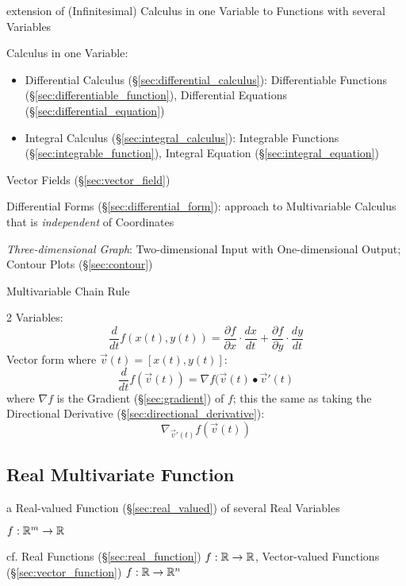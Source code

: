 extension of (Infinitesimal) Calculus in one Variable to Functions with several
Variables

Calculus in one Variable:
\begin{itemize}
\item Differential Calculus (\S\ref{sec:differential_calculus}): Differentiable
  Functions (\S\ref{sec:differentiable_function}), Differential Equations
  (\S\ref{sec:differential_equation})
\item Integral Calculus (\S\ref{sec:integral_calculus}): Integrable Functions
  (\S\ref{sec:integrable_function}), Integral Equation
  (\S\ref{sec:integral_equation})
\end{itemize}

\fist Vector Fields (\S\ref{sec:vector_field})

\fist Differential Forms (\S\ref{sec:differential_form}): approach to
Multivariable Calculus that is \emph{independent} of Coordinates

\emph{Three-dimensional Graph}: Two-dimensional Input with One-dimensional
Output; Contour Plots (\S\ref{sec:contour})

Multivariable Chain Rule

2 Variables:
\[
  \frac{d}{dt} f(x(t),y(t)) =
    \frac{\partial{f}}{\partial{x}} \cdot \frac{dx}{dt}
      + \frac{\partial{f}}{\partial{y}} \cdot \frac{dy}{dt}
\]
Vector form where $\vec{v}(t) = [x(t),y(t)]$:
\[
  \frac{d}{dt}f(\vec{v}(t)) = \nabla{f(\vec{v}(t)}\bullet{\vec{v}'(t)}
\]
where $\nabla{f}$ is the Gradient (\S\ref{sec:gradient}) of $f$; this the same
as taking the Directional Derivative (\S\ref{sec:directional_derivative}):
\[
  \nabla_{\vec{v}'(t)}f(\vec{v}(t))
\]



\subsection{Real Multivariate Function}\label{sec:real_multivariate_function}

a Real-valued Function (\S\ref{sec:real_valued}) of several Real Variables

$f : \mathbb{R}^m \rightarrow \mathbb{R}$

cf. Real Functions (\S\ref{sec:real_function}) $f : \mathbb{R} \rightarrow \mathbb{R}$,
Vector-valued Functions (\S\ref{sec:vector_function})
$f : \mathbb{R} \rightarrow \mathbb{R}^n$



